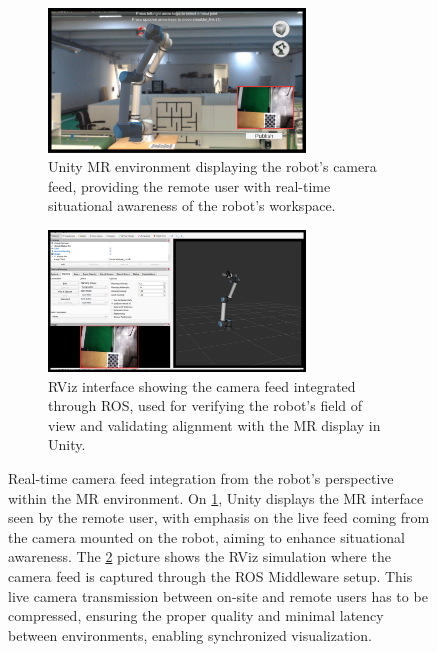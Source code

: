 \begin{figure}[h]
    \centering
    \begin{subfigure}{\textwidth}
        \centering
        \includegraphics[width=0.75\textwidth]{figs/camera-feed-transmission-alone-1.png}
        \caption{Unity \ac{MR} environment displaying the robot’s camera feed, providing the remote user with real-time situational awareness of the robot’s workspace.}       
        \label{fig:camera-unity}
    \end{subfigure}

    \vspace{0.8em} %

    \begin{subfigure}{\textwidth}
        \centering
        \includegraphics[width=0.75\textwidth]{figs/camera-feed-transmission-alone-2.png}
        \caption{RViz interface showing the camera feed integrated through \ac{ROS}, used for verifying the robot’s field of view and validating alignment with the \ac{MR} display in Unity.}
        \label{fig:camera-rviz}
    \end{subfigure}
    
    \caption{Real-time camera feed integration from the robot’s perspective within the \ac{MR} environment. On \ref{fig:camera-unity}, Unity displays the \ac{MR} interface seen by the remote user, with emphasis on the live feed coming from the camera mounted on the robot, aiming to enhance situational awareness. The \ref{fig:camera-rviz} picture shows the RViz simulation where the camera feed is captured through the \ac{ROS} Middleware setup. This live camera transmission between on-site and remote users has to be compressed, ensuring the proper quality and minimal latency between environments, enabling synchronized visualization.}
\label{fig:camera-feed}
\end{figure}


